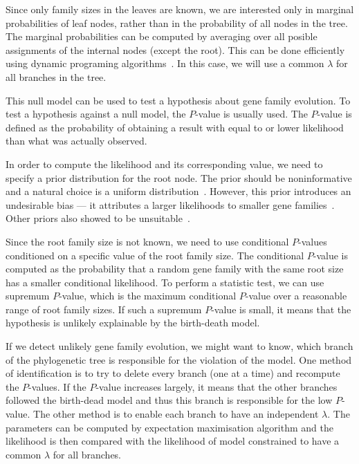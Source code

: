 Since only family sizes in the leaves are known, we are interested only in marginal probabilities of leaf nodes, rather than in the probability of all nodes in the tree. The marginal probabilities can be computed by averaging over all posible assignments of the internal nodes (except the root). This can be done efficiently using dynamic programing algorithms~\cite{felsenstein1981evolutionary}. In this case, we will use a common $\lambda$ for all branches in the tree.

This null model can be used to test a hypothesis about gene family evolution.
To test a hypothesis against a null model, the $P$-value is usually used. The $P$-value is defined as the probability of obtaining a result with equal to or lower likelihood than what was actually observed.

In order to compute the likelihood and its corresponding value, we need to specify a prior distribution for the root node. The prior should be noninformative and a natural choice is a uniform distribution~\cite{felsenstein1981evolutionary}. However, this prior introduces an undesirable bias --- it attributes a larger likelihoods to smaller gene families~\cite{hahn2005estimating}. Other priors also showed to be unsuitable~\cite{hahn2005estimating}.

Since the root family size is not known, we need to use conditional $P$-values conditioned on a specific value of the root family size.
The conditional $P$-value is computed as the probability that a random gene family with the same root size has a smaller conditional likelihood.
To perform a statistic test, we can use supremum $P$-value, which is the maximum conditional $P$-value over a reasonable range of root family sizes.
If such a supremum $P$-value is small, it means that the hypothesis is unlikely explainable by the birth-death model.

If we detect unlikely gene family evolution, we might want to know, which branch of the phylogenetic tree is responsible for the violation of the model.
One method of identification is to try to delete every branch (one at a time) and recompute the $P$-values. If the $P$-value increases largely, it means that the other branches followed the birth-dead model and thus this branch is responsible for the low $P$-value.
The other method is to enable each branch to have an independent $\lambda$. The parameters can be computed by expectation maximisation algorithm and the likelihood is then compared with the likelihood of model constrained to have a common $\lambda$ for all branches.

